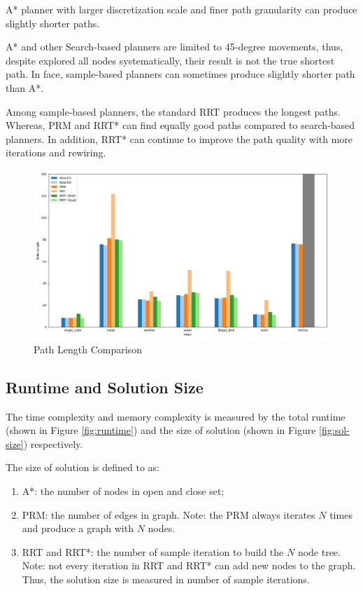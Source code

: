 \documentclass[conference]{IEEEtran}
\begin{document}
A* planner with larger discretization scale and finer path granularity can
produce slightly shorter paths. 

A* and other Search-based planners are limited to 45-degree movements,
thus, despite explored all nodes systematically, 
their result is not the true shortest path.
In face, sample-based planners can sometimes produce slightly shorter path than A*.

Among sample-based planners, 
the standard RRT produces the longest paths. 
Whereas, PRM and RRT* can find equally good paths compared to search-based planners.
In addition, RRT* can continue to improve the path quality with more iterations and rewiring.

\begin{figure}[h]
    \centering
    \includegraphics[width=\linewidth]{img/path_length.png}
    \caption{Path Length Comparison}
    \label{fig:path-length}
\end{figure}


\subsection{Runtime and Solution Size}
The time complexity and memory complexity is measured by 
the total runtime (shown in Figure \ref{fig:runtime}) and
the size of solution (shown in Figure \ref{fig:sol-size}) respectively.

The size of solution
is defined to as:
\begin{enumerate}
    \item A*: the number of nodes in open and close set;
    \item PRM: the number of edges in graph. 
    Note: the PRM always iterates $N$ times and produce a graph with $N$ nodes.
    \item RRT and RRT*: the number of sample iteration to build the $N$ node tree. 
    Note: not every iteration in RRT and RRT* can add new nodes to the graph.
    Thus, the solution size is measured in number of sample iterations.
\end{enumerate}
\end{document}
